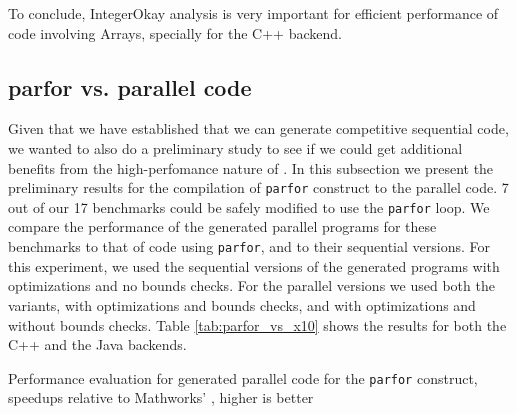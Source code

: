 To conclude, IntegerOkay analysis is very important for efficient performance of
code involving Arrays, specially for the \xten C++ backend.

\subsection{\matlab parfor vs. \mixten parallel code}
\label{subsec:parfor_results}
 
Given that we have established that we can generate competitive
sequential code, we wanted to also do a preliminary study to see if we
could get additional benefits from the high-perfomance nature of \xten.
In this subsection we present the preliminary results for the
compilation of \matlab \texttt{parfor} construct to the parallel \xten
code. 7 out of our 17 benchmarks could be safely modified to use the
\texttt{parfor} loop.  We compare the performance of the generated
parallel \xten programs for these benchmarks to that of \matlab code
using \texttt{parfor}, and to their sequential \xten versions. For this
experiment, we used the sequential versions of the generated \xten
programs with optimizations and no bounds checks.  For the parallel
versions we used both the variants, with optimizations and bounds
checks, and with optimizations and without bounds checks.  Table
\ref{tab:parfor_vs_x10} shows the results for both the \xten C++ and the
\xten Java backends.
   
\begin{table}[htbp]
\begin{center} 
\begin{footnotesize}
 
\end{footnotesize}
\caption{Performance evaluation for \mixten generated
parallel \xten code for the \matlab \texttt{parfor} construct, speedups
relative to Mathworks' \matlab,  higher is better} 
\label{tab:parfor_vs_x10} 
\end{center} 
\end{table}


